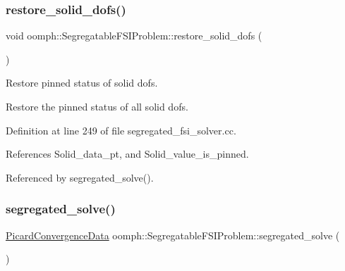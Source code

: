 \mbox{\label{classoomph_1_1SegregatableFSIProblem_a6da202671582bf7bf13a3dceb115385f}} 
\subsubsection{\texorpdfstring{restore\+\_\+solid\+\_\+dofs()}{restore\_solid\_dofs()}}
{\footnotesize\ttfamily void oomph\+::\+Segregatable\+F\+S\+I\+Problem\+::restore\+\_\+solid\+\_\+dofs (\begin{DoxyParamCaption}{ }\end{DoxyParamCaption})\hspace{0.3cm}{\ttfamily [protected]}}



Restore pinned status of solid dofs. 

Restore the pinned status of all solid dofs. 

Definition at line 249 of file segregated\+\_\+fsi\+\_\+solver.\+cc.



References Solid\+\_\+data\+\_\+pt, and Solid\+\_\+value\+\_\+is\+\_\+pinned.



Referenced by segregated\+\_\+solve().

\mbox{\label{classoomph_1_1SegregatableFSIProblem_a87a69561674c1e596bb205e0fc4a387f}} 
\subsubsection{\texorpdfstring{segregated\+\_\+solve()}{segregated\_solve()}}
{\footnotesize\ttfamily \hyperlink{classoomph_1_1PicardConvergenceData}{Picard\+Convergence\+Data} oomph\+::\+Segregatable\+F\+S\+I\+Problem\+::segregated\+\_\+solve (\begin{DoxyParamCaption}{ }\end{DoxyParamCaption})}



